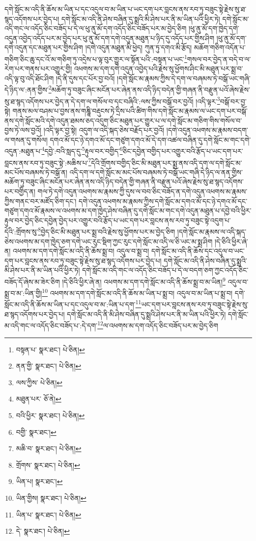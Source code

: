 དགེ་སློང་མ་འདི་ནི་ཆོས་མ་ཡིན་པ་དང་འདུལ་བ་མ་ཡིན་པ་ཡང་དག་པར་བླངས་ནས་རབ་ཏུ་བཟུང་སྟེ་རྗེས་སུ་ཐ་སྙད་འདོགས་པར་བྱེད་པ། དགེ་སློང་མ་འདི་ནི་ཤེས་བཞིན་དུ་སྨྲའི་མི་ཤེས་པར་ནི་མ་ཡིན་པའི་ཕྱིར་ཏེ། དགེ་སློང་མ་འདི་གང་ལ་འདོད་ཅིང་བཟོད་པ་དེ་ལ་ཕུ་ནུ་མོ་དག་འདོད་ཅིང་བཟོད་པར་མ་བྱེད་ཅིག །ཕུ་ནུ་མོ་དག་ཁྱེད་དགེ་འདུན་འབྱེད་འདོད་པར་མ་བྱེད་པར་ཕུ་ནུ་མོ་དག་དགེ་འདུན་མཐུན་པ་ཉིད་དུ་འདོད་པར་གྱིས་ཤིག །ཕུ་ནུ་མོ་དག་དགེ་འདུན་དང་མཐུན་པར་གྱིས་ཤིག །དགེ་འདུན་མཐུན་མི་ཕྱེད། ཀུན་ཏུ་དགའ་མི་རྩོད། མཆོག་གཅིག་འདོན་པ་གཅིག་ཅིང་ཆུ་དང་འོ་མ་གཅིག་ཏུ་འདྲེས་པ་ལྟ་བུར་གྱུར་ལ་སྟོན་པའི་:བསྟན་པ་ཡང་\footnote{བསྟན་པ་  སྣར་ཐང་།  པེ་ཅིན། }གསལ་བར་བྱེད་ན་བདེ་བ་ལ་རེག་པར་གནས་པར་འགྱུར་གྱི། འཕགས་མ་དག་དགེ་འདུན་འབྱེད་པའི་རྗེས་སུ་ཕྱོགས་ཤིང་མི་མཐུན་པར་སྨྲ་བ་འདི་ལྟ་བུ་འདི་ཐོང་ཤིག །དེ་ནི་དུས་དང་པོར་བྱ་བའོ། །དགེ་སློང་མ་རྣམས་ཀྱིས་དེ་དག་ལ་བཞམས་ཏེ་བསྒོ་ཡང་གཞི་དེ་ཉིད་ལ་:ནན་གྱིས་\footnote{ནན་གྱི་  སྣར་ཐང་།  པེ་ཅིན། }མཆོག་ཏུ་བཟུང་ཞིང་མངོན་པར་ཞེན་ནས་འདི་ཉིད་བདེན་གྱི་གཞན་ནི་བརྫུན་པའོ་ཞེས་རྗེས་སུ་ཐ་སྙད་འདོགས་པར་བྱེད་ན་དེ་དག་ལ་གསོལ་བ་དང་བཞིའི་:ལས་ཀྱིས་བསྒོ་བར་བྱའོ། །འདི་ལྟར་\footnote{ལས་ཀྱིས་  པེ་ཅིན། }བསྒོ་བར་བྱ་སྟེ། གནས་མལ་བཤམ་པ་བྱས་ནས་གཎྜཱི་བརྡུངས་ཏེ་དྲིས་པའི་ཚིག་གིས་དགེ་སློང་མ་རྣམས་ལ་ཡང་དག་པར་བསྒོ་ནས་དགེ་སློང་མའི་དགེ་འདུན་ཐམས་ཅད་འདུག་ཅིང་མཐུན་པར་གྱུར་པ་ལ་དགེ་སློང་མ་གཅིག་གིས་གསོལ་བ་བྱས་ཏེ་ལས་བྱའོ། །འདི་ལྟར་བྱ་སྟེ། འདུག་ལ་འདི་སྐད་ཅེས་བརྗོད་པར་བྱའོ། །དགེ་འདུན་འཕགས་མ་རྣམས་བདག་ལ་གསན་དུ་གསོལ། དགའ་མོ་དང་ཉེ་དགའ་མོ་དང་གཙུག་དགའ་མོ་དེ་དག་འཚལ་བཞིན་དུ་དགེ་སློང་མ་གང་དགེ་འདུན་:མཐུན་པ་\footnote{མཐུན་པར་  ཅོ་ནེ། }དབྱེ་:བའི་སླད་དུ་\footnote{བའི་ཕྱིར་  སྣར་ཐང་།  པེ་ཅིན། }རྟུལ་བར་བགྱིད་\footnote{བགྱི་  སྣར་ཐང་། }ཅིང་དབྱེན་བགྱིད་པར་འགྱུར་བའི་རྩོད་པ་ཡང་དག་པར་བླངས་ནས་རབ་ཏུ་བཟུང་སྟེ་:མཆིས་པ་\footnote{མཆི་བ་  སྣར་ཐང་།  པེ་ཅིན། }དེའི་གྲོགས་བགྱིད་ཅིང་མི་མཐུན་པར་སྨྲ་ནས་འདི་དག་ལ་དགེ་སློང་མ་མང་པོས་བཞམས་ཏེ་བསྒོ་ན། འདི་དག་ལ་དགེ་སློང་མ་མང་པོས་བཞམས་ཏེ་བསྒོ་ཡང་གཞི་དེ་ཉིད་ལ་ནན་གྱིས་མཆོག་ཏུ་བཟུང་ཞིང་མངོན་པར་ཞེན་ནས་འདི་ཉིད་བདེན་གྱི་གཞན་ནི་བརྫུན་པའོ་ཞེས་རྗེས་སུ་ཐ་སྙད་འདོགས་པར་བགྱིད་ན། གལ་ཏེ་དགེ་འདུན་འཕགས་མ་རྣམས་ཀྱི་དུས་ལ་བབ་ཅིང་བཟོད་ན་དགེ་འདུན་འཕགས་མ་རྣམས་ཀྱིས་གནང་བར་མཛོད་ཅིག་དང་། དགེ་འདུན་འཕགས་མ་རྣམས་ཀྱིས་དགེ་སློང་མ་དགའ་མོ་དང་ཉེ་དགའ་མོ་དང་གཙུག་དགའ་མོ་རྣམས་ལ་འཕགས་མ་དག་ཁྱེད་ཤེས་བཞིན་དུ་དགེ་སློང་མ་གང་དགེ་འདུན་མཐུན་པ་དབྱེ་བའི་ཕྱིར་རྟུལ་བར་བྱེད་ཅིང་དབྱེན་བྱེད་པར་འགྱུར་བའི་རྩོད་པ་ཡང་དག་པར་བླངས་ནས་རབ་ཏུ་བཟུང་སྟེ་འདུག་པ་དེའི་:གྲོགས་སུ་\footnote{གྲོགས་  སྣར་ཐང་།  པེ་ཅིན། }བྱེད་ཅིང་མི་མཐུན་པར་སྨྲ་བའི་རྗེས་སུ་ཕྱོགས་པར་མ་བྱེད་ཅིག །དགེ་སློང་མ་རྣམས་ལ་འདི་སྐད་ཅེས་འཕགས་མ་དག་ཁྱེད་ཅག་དགེ་ཡང་རུང་སྡིག་ཀྱང་རུང་དགེ་སློང་མ་འདི་ལ་ཅི་ཡང་མ་སྨྲ་ཤིག །དེ་ཅིའི་ཕྱིར་ཞེ་ན། འཕགས་མ་དག་དགེ་སློང་མ་འདི་ནི་ཆོས་སྨྲ་བ། འདུལ་བ་སྨྲ་བ། དགེ་སློང་མ་འདི་ནི་ཆོས་དང་འདུལ་བ་ཡང་དག་པར་བླངས་ནས་རབ་ཏུ་བཟུང་སྟེ་རྗེས་སུ་ཐ་སྙད་འདོགས་པར་བྱེད་པ། དགེ་སློང་མ་འདི་ནི་ཤེས་བཞིན་དུ་སྨྲའི་མི་ཤེས་པར་ནི་མ་ཡིན་པའི་ཕྱིར་ཏེ། དགེ་སློང་མ་འདི་གང་ལ་འདོད་ཅིང་བཟོད་པ་དེ་ལ་བདག་ཅག་ཀྱང་འདོད་ཅིང་བཟོད་དོ་ཞེས་མ་ཟེར་ཅིག །དེ་ཅིའི་ཕྱིར་ཞེ་ན། འཕགས་མ་དག་དགེ་སློང་མ་འདི་ནི་ཆོས་སྨྲ་བ་མ་ཡིན།\footnote{ཡིན་པ།  སྣར་ཐང་། } འདུལ་བ་སྨྲ་བ་མ་:ཡིན་གྱི།\footnote{ཡིན་གྱིས།  སྣར་ཐང་།  པེ་ཅིན། } འཕགས་མ་དག་དགེ་སློང་མ་འདི་ནི་ཆོས་མ་ཡིན་པ་སྨྲ་བ། འདུལ་བ་མ་ཡིན་པ་སྨྲ་བ། དགེ་སློང་མ་འདི་ནི་ཆོས་མ་ཡིན་པ་དང་འདུལ་བ་མ་:ཡིན་པ་དག་\footnote{ཡིན་པ་  སྣར་ཐང་།  པེ་ཅིན། }ཡང་དག་པར་བླངས་ནས་རབ་ཏུ་བཟུང་སྟེ་རྗེས་སུ་ཐ་སྙད་འདོགས་པར་བྱེད་པ། དགེ་སློང་མ་འདི་ནི་མི་ཤེས་བཞིན་དུ་སྨྲའི་ཤེས་པར་ནི་མ་ཡིན་པའི་ཕྱིར་ཏེ། དགེ་སློང་མ་འདི་གང་ལ་འདོད་ཅིང་བཟོད་པ་:དེ་དག་\footnote{དེ་  སྣར་ཐང་།  པེ་ཅིན། }ལ་འཕགས་མ་དག་འདོད་ཅིང་བཟོད་པར་མ་བྱེད་ཅིག 